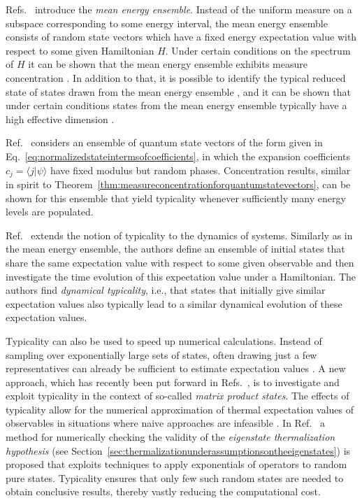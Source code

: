 \documentclass[a4paper,12pt,listof=totoc,index=totoc,bibliography=totoc,headsepline=false,headings=normal,BCOR16.153846mm,DIV12,headinclude,twoside,cleardoublepage=empty,numbers=noenddot,final]{scrreprt}
\theoremstyle{mystyle}
\numberwithin{equation}{section}
\numberwithin{figure}{section}
\numberwithin{lemma}{section}
\numberwithin{theorem}{section}
\numberwithin{corollary}{section}
\numberwithin{definition}{section}
\numberwithin{conjecture}{section}
\numberwithin{observation}{section}
\newcommand{\+}{\mkern2mu}
\newcommand{\texteqref}[1]{Eq.~\eqref{#1}}
\renewcommand{\H}{H}
\newcommand{\braket}[2]{\langle #1 | #2 \rangle}
\DeclareMathOperator{\1}{\mathds{1}}
\begin{document}
Refs.~\cite{Bender05,Brody07,1003.4982,1104.4625v1} introduce the \emph{mean energy ensemble}.
Instead of the uniform measure on a subspace corresponding to some energy interval, the mean energy ensemble consists of random state vectors which have a fixed energy expectation value with respect to some given Hamiltonian $\H$.
Under certain conditions on the spectrum of $\H$ it can be shown that the mean energy ensemble exhibits measure concentration \cite{1003.4982}.
In addition to that, it is possible to identify the typical reduced state of states drawn from the mean energy ensemble \cite{1003.4982}, and it can be shown that under certain conditions states from the mean energy ensemble typically have a high effective dimension \cite{Gogolin10-masterthesis}.

Ref.~\cite{Reimann07} considers an ensemble of quantum state vectors of the form given in \texteqref{eq:normalizedstateintermsofcoefficients}, in which the expansion coefficients $c_j = \braket{j}{\psi}$ have fixed modulus but random phases. 
Concentration results, similar in spirit to Theorem~\ref{thm:measureconcentrationforquantumstatevectors}, can be shown for this ensemble that yield typicality whenever sufficiently many energy levels are populated.

Ref.~\cite{Bartsch09} extends the notion of typicality to the dynamics of systems.
Similarly as in the mean energy ensemble, the authors define an ensemble of initial states that share the same expectation value with respect to some given observable and then investigate the time evolution of this expectation value under a Hamiltonian.
The authors find \emph{dynamical typicality}, i.e., that states that initially give similar expectation values also typically lead to a similar dynamical evolution of these expectation values.

Typicality can also be used to speed up numerical calculations.
Instead of sampling over exponentially large sets of states, often drawing just a few representatives can already be sufficient to estimate expectation values \cite{Sugiura12}.
A new approach, which has recently been put forward in Refs.~\cite{Garnerone2010,Garnerone10-1,Garnerone2013,Garnerone2013a}, is to investigate and exploit typicality in the context of so-called \emph{matrix product states}.
The effects of typicality allow for the numerical approximation of thermal expectation values of observables in situations where naive approaches are infeasible \cite{Garnerone2013a}.
In Ref.~\cite{Steinigeweg2013} a method for numerically checking the validity of the \emph{eigenstate thermalization hypothesis} (see Section~\ref{sec:thermalizationunderassumptionsontheeigenstates}) is proposed that exploits techniques to apply exponentials of operators to random pure states.
Typicality ensures that only few such random states are needed to obtain conclusive results, thereby vastly reducing the computational cost.
\end{document}
